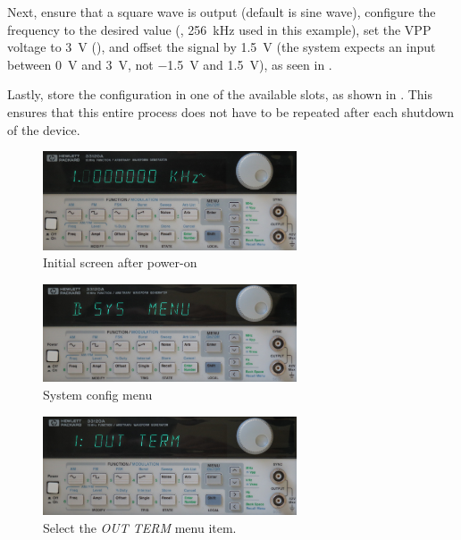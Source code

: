Next,  ensure  that   a  square  wave  is  output  (default   is  sine  wave),
configure  the   frequency  to  the  desired   value  (,
\SI{256}{\kilo\hertz}   used   in  this   example),   set   the  VPP   voltage
to   \SI{3}{\volt}  (),   and   offset   the  signal   by
\SI{1.5}{\volt}  (the  system  expects  an  input  between  \SI{0}{\volt}  and
\SI{3}{\volt},  not   \SI{-1.5}{\volt}  and  \SI{+1.5}{\volt}),  as   seen  in
.

Lastly, store  the configuration in  one of the  available slots, as  shown in
. This ensures  that this entire process  does not have
to be repeated after each shutdown of the device.


\begin{figure}
    \centering
    \includegraphics[width=0.67\textwidth]{images/funcGen/funcGen-01.jpg}
    \caption{Initial screen after power-on}
    \label{fig:HPwave:poweron}
\end{figure}

\begin{figure}
    \centering
    \includegraphics[width=0.67\textwidth]{images/funcGen/funcGen-02.jpg}
    \caption{System config menu}
    \label{fig:HPwave:sysMenu}
\end{figure}

\begin{figure}
    \centering
    \includegraphics[width=0.67\textwidth]{images/funcGen/funcGen-03.jpg}
    \caption{Select the \emph{OUT TERM} menu item.}
    \label{fig:HPwave:outTerm}
\end{figure}

